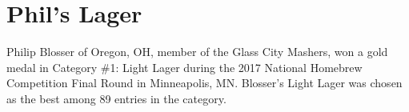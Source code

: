 \chapter*{Phil's Lager}

\begin{aboutblock}
Philip Blosser of Oregon, OH, member of the Glass City Mashers, won a gold medal in
Category \#1: Light Lager during the 2017 National Homebrew Competition Final Round in
Minneapolis, MN. Blosser’s Light Lager was chosen as the best among 89 entries in the
category.
\end{aboutblock}


\begin{methodandtiming}
  
\begin{mashsteps}
\end{mashsteps}

\begin{fermentationsteps}
\end{fermentationsteps}

\end{methodandtiming}

\pagebreak

\begin{ingredientsblock}

\begin{malts}
\end{malts}

\begin{hops}
\end{hops}

\begin{yeasts}
\end{yeasts}

\end{ingredientsblock}

